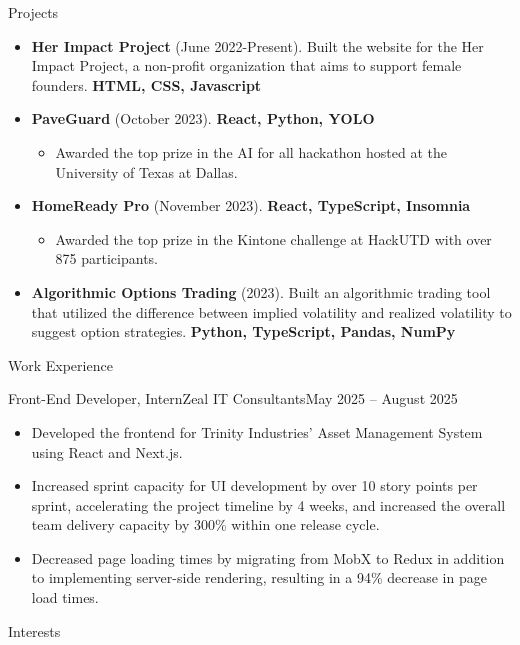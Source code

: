 \documentclass[]{mcdowellcv}
\begin{document}
	\begin{cvsection}{Projects}
		\begin{cvsubsection}{}{}{}	
			\begin{itemize}
				\item \textbf{Her Impact Project} (June 2022-Present).  Built the website for the Her Impact Project, a non-profit organization that aims to support female founders. \textbf{HTML, CSS, Javascript}
				\item \textbf{PaveGuard} (October 2023). \textbf{React, Python, YOLO}
				\begin{itemize}
					\item Awarded the top prize in the AI for all hackathon hosted at the University of Texas at Dallas.
				\end{itemize}
				\item \textbf{HomeReady Pro} (November 2023). \textbf{React, TypeScript, Insomnia}
				\begin{itemize}
				\item Awarded the top prize in the Kintone challenge at HackUTD with over 875 participants.
				\end{itemize}
				\item \textbf{Algorithmic Options Trading} (2023). Built an algorithmic trading tool that utilized the difference between implied volatility and realized volatility to suggest option strategies. \textbf{Python, TypeScript, Pandas, NumPy}
			\end{itemize}
		\end{cvsubsection}
	\end{cvsection}
		\begin{cvsection}{Work Experience}
		\begin{cvsubsection}{Front-End Developer, Intern}{Zeal IT Consultants}{May 2025 -- August 2025}			
			\begin{itemize}
				\item Developed the frontend for Trinity Industries' Asset Management System using React and Next.js.
				\item Increased sprint capacity for UI development by over 10 story points per sprint, accelerating the project timeline by 4 weeks, and increased the overall team delivery capacity by 300\% within one release cycle.
				\item Decreased page loading times by migrating from MobX to Redux in addition to implementing server-side rendering, resulting in a 94\% decrease in page load times.
			\end{itemize}
		\end{cvsubsection}
	\end{cvsection}

	\begin{cvsection}{Interests}
		\begin{cvsubsection}{}{}{}			
		\end{cvsubsection}
	\end{cvsection}

	
\end{document}

